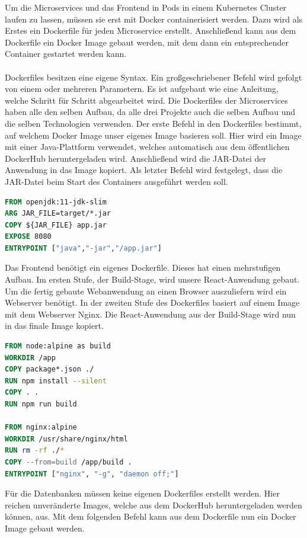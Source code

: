 Um die Microservices und das Frontend in Pods in einem Kubernetes Cluster laufen zu lassen, müssen sie erst mit Docker containerisiert werden. Dazu wird als Erstes ein Dockerfile für jeden Microservice erstellt. Anschließend kann aus dem Dockerfile ein Docker Image gebaut werden, mit dem dann ein entsprechender Container gestartet werden kann. \\
\\

Dockerfiles besitzen eine eigene Syntax. Ein großgeschriebener Befehl wird gefolgt von einem oder mehreren Parametern. Es ist aufgebaut wie eine Anleitung, welche Schritt für Schritt abgearbeitet wird. Die Dockerfiles der Microservices haben alle den selben Aufbau, da alle drei Projekte auch die selben Aufbau und die selben Technologien verwenden. Der erste Befehl in den Dockerfiles bestimmt, auf welchem Docker Image unser eigenes Image basieren soll. Hier wird ein Image mit einer Java-Plattform verwendet, welches automatisch aus dem öffentlichen DockerHub heruntergeladen wird. Anschließend wird die JAR-Datei der Anwendung in das Image kopiert. Als letzter Befehl wird festgelegt, dass die JAR-Datei beim Start des Containers ausgeführt werden soll.

\begin{lstlisting}[language=dockerfile, caption=Dockerfile für Kontakt-Microservice]
FROM openjdk:11-jdk-slim
ARG JAR_FILE=target/*.jar
COPY ${JAR_FILE} app.jar
EXPOSE 8080
ENTRYPOINT ["java","-jar","/app.jar"]
\end{lstlisting}

Das Frontend benötigt ein eigenes Dockerfile. Dieses hat einen mehrstufigen Aufbau. Im ersten Stufe, der Build-Stage, wird unsere React-Anwendung gebaut. Um die fertig gebaute Webanwendung an einen Browser auszuliefern wird ein Webserver benötigt. In der zweiten Stufe des Dockerfiles basiert auf einem Image mit dem Webserver Nginx. Die React-Anwendung aus der Build-Stage wird nun in das finale Image kopiert.

\begin{lstlisting}[language=dockerfile, caption=Dockerfile für Frontend]
FROM node:alpine as build
WORKDIR /app
COPY package*.json ./
RUN npm install --silent
COPY . .
RUN npm run build

FROM nginx:alpine
WORKDIR /usr/share/nginx/html
RUN rm -rf ./*
COPY --from=build /app/build .
ENTRYPOINT ["nginx", "-g", "daemon off;"]
\end{lstlisting}

Für die Datenbanken müssen keine eigenen Dockerfiles erstellt werden. Hier reichen unveränderte Images, welche aus dem DockerHub heruntergeladen werden können, aus. Mit dem folgenden Befehl kann aus dem Dockerfile nun ein Docker Image gebaut werden.


